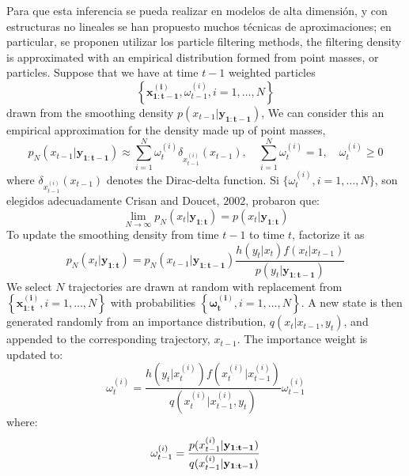 Para que esta inferencia se pueda realizar en modelos de alta dimensión, 
y con estructuras no lineales se han propuesto muchos técnicas de aproximaciones; 
en particular, se proponen utilizar los particle filtering methods, the filtering 
density is approximated with an empirical distribution formed from point masses,
 or particles. Suppose that we have at time $t-1$ weighted particles
 \begin{equation}
 \left\{\mathbf{x_{1:t-1}^{(i)}},\omega_{t-1}^{(i)}, i=1,\ldots,N \right\}
 \end{equation}
drawn from the smoothing density $p(x_{t-1}|\mathbf{y_{1:t-1}})$, 
We can consider this an empirical approximation for the density
made up of point masses,
\begin{equation}
p_{N}\left(x_{t-1}|\mathbf{y_{1:t-1}}\right) \approx \sum_{i=1}^{N}\omega_{t}^{(i)}\delta_{x_{t-1}^{(i)}}(x_{t-1}),\quad
 \sum_{i=1}^{N}\omega_{t}^{(i)}=1,\quad  \omega_{t}^{(i)}\geq 0
\end{equation}
where $\delta_{x_{t-1}^{(i)}}(x_{t-1})$ denotes the Dirac-delta function.
Si $\{\omega_{t}^{(i)},i=1,\ldots,N\}$, son elegidos adecuadamente
Crisan and Doucet, $2002$, probaron que:
\begin{equation}
\lim_{N\rightarrow\infty}p_{N}\left(x_{t}|\mathbf{y_{1:t}}\right)=p(x_{t}|\mathbf{y_{1:t}})
\end{equation}
To update the smoothing density from time $t-1$ to time $t$,
factorize it as
\begin{equation}
	p_{N}\left(x_{t}|\mathbf{y_{1:t}}\right)=p_{N}\left(x_{t-1}|\mathbf{y_{1:t-1}}\right)
	\frac{h\left(y_{t}|x_{t}\right)f\left(x_{t}|x_{t-1}\right)}{p\left(y_{t}|\mathbf{y_{1:t-1}}\right) }
\end{equation}
We select $N$ trajectories are drawn at random with replacement from 
$\left\{\mathbf{x_{1:t}^{(i)}}, i=1,\ldots,N \right\}$
with probabilities $\left\{\mathbf{\omega_{t}^{(i)}}, i=1,\ldots,N \right\}$. 
A new state is then generated randomly from an importance distribution,
$q(x_{t}|x_{t-1}, y_{t})$, and appended to the corresponding trajectory,
$x_{t-1}$. The importance weight is updated to:
\begin{equation}
\omega_{t}^{(i)}=\frac{h(y_{t}|x_{t}^{(i)})f(x_{t}^{(i)}|x_{t-1}^{(i)})}
{q(x_{t}^{(i)}|x_{t-1}^{(i)},y_{t})}\omega_{t-1}^{(i)}
\end{equation}
where:
\begin{equation}
\omega_{t-1}^{(i)} = \frac{p(x_{t-1}^{(i)}|\mathbf{y_{1:t-1}})}
{q(x_{t-1}^{(i)}|\mathbf{y_{1:t-1}})}\\
\end{equation}
